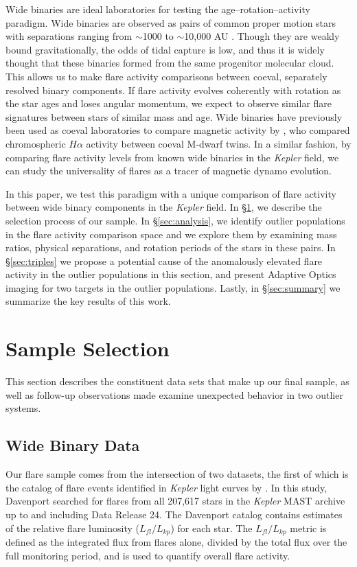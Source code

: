 \documentclass[preprint2]{aastex61}
\newcommand{\Kepler}{\textsl{Kepler}\xspace}
\begin{document}
Wide binaries are ideal laboratories for testing the age--rotation--activity paradigm. Wide binaries are observed as pairs of common proper motion stars with separations ranging from $\sim$1000 to $\sim$10,000 AU \citep{moe&stefano2017}. Though they are weakly bound gravitationally, the odds of tidal capture is low, and thus it is widely thought that these binaries formed from the same progenitor molecular cloud. This allows us to make flare activity comparisons between coeval, separately resolved binary components. If flare activity evolves coherently with rotation as the star ages and loses angular momentum, we expect to observe similar flare signatures between stars of similar mass and age. Wide binaries have previously been used as coeval laboratories to compare magnetic activity by \citet{gunning2014}, who compared chromospheric $H\alpha$ activity between coeval M-dwarf twins. In a similar fashion, by comparing flare activity levels from known wide binaries in the \Kepler field, we can study the universality of flares as a tracer of magnetic dynamo evolution. 

In this paper, we test this paradigm with a unique comparison of flare activity between wide binary components in the \Kepler field. In \S\ref{sec:sample}, we describe the selection process of our sample. In \S\ref{sec:analysis}, we identify outlier populations in the flare activity comparison space and we explore them by examining mass ratios, physical separations, and rotation periods of the stars in these pairs. In \S\ref{sec:triples} we propose a potential cause of the anomalously elevated flare activity in the outlier populations in this section, and present Adaptive Optics imaging for two targets in the outlier populations. Lastly, in \S\ref{sec:summary} we summarize the key results of this work.


\section{Sample Selection}
\label{sec:sample}

This section describes the constituent data sets that make up our final sample, as well as follow-up observations made examine unexpected behavior in two outlier systems.

\subsection{Wide Binary Data}

Our flare sample comes from the intersection of two datasets, the first of which is the catalog of flare events identified in \Kepler light curves by \citet{davenport2016}. In this study, Davenport searched for flares from all 207,617 stars in the \Kepler MAST archive up to and including Data Release 24. The Davenport catalog contains estimates of the relative flare luminosity ($L_{fl}/L_{kp}$) for each star. The $L_{fl}/L_{kp}$ metric is defined as the integrated flux from flares alone, divided by the total flux over the full monitoring period, and is used to quantify overall flare activity. 
\end{document}
